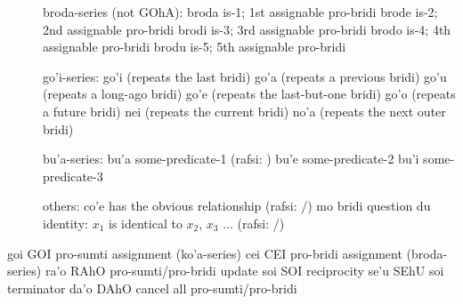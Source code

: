 \begin{description}
\item[] broda-series (not GOhA): broda is-1; 1st assignable pro-bridi brode is-2; 2nd assignable pro-bridi brodi is-3; 3rd assignable pro-bridi brodo is-4; 4th assignable pro-bridi brodu is-5; 5th assignable pro-bridi
\item[] go'i-series: go'i (repeats the last bridi) go'a (repeats a previous bridi) go'u (repeats a long-ago bridi) go'e (repeats the last-but-one bridi) go'o (repeats a future bridi) nei (repeats the current bridi) no'a (repeats the next outer bridi)
\item[] bu'a-series: bu'a some-predicate-1 (rafsi: ) bu'e some-predicate-2 bu'i some-predicate-3
\item[] others: co'e has the obvious relationship (rafsi: /) mo bridi question du identity: $x_1$ is identical to $x_2$, $x_3$ ... (rafsi: /)
\end{description}



goi GOI pro-sumti assignment (ko'a-series)
    cei CEI pro-bridi assignment (broda-series)
    ra'o    RAhO    pro-sumti/pro-bridi update
    soi SOI reciprocity
    se'u    SEhU    soi terminator
    da'o    DAhO    cancel all pro-sumti/pro-bridi
